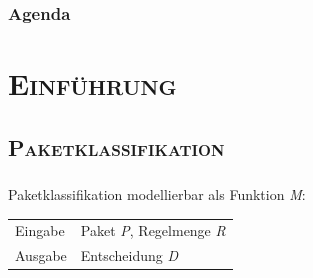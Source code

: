 \documentclass[xcolor=x11names,compress]{beamer}
\renewcommand{\(}{\begin{columns}}
\renewcommand{\)}{\end{columns}}
\newcommand{\<}[1]{\begin{column}{#1}}
\renewcommand{\>}{\end{column}}
\begin{document}

\begin{frame}
  \frametitle{Agenda}
  \tableofcontents
\end{frame}

\section{\scshape Einführung}
\subsection{\scshape Paketklassifikation}
\begin{frame}
  \frametitle{\insertsubsection}
  Paketklassifikation modellierbar als Funktion \textit{M}:
  \begin{tcolorbox}[colback=blue!5!white,colframe=blue!75!black,title=Definition,drop fuzzy shadow]
  \begin{tabularx}{\textwidth}{XX}
    Eingabe&Paket \textit{P}, Regelmenge \textit{R}\\
    Ausgabe&Entscheidung \textit{D}
  \end{tabularx}
  \end{tcolorbox}
\end{frame}
\end{document}
